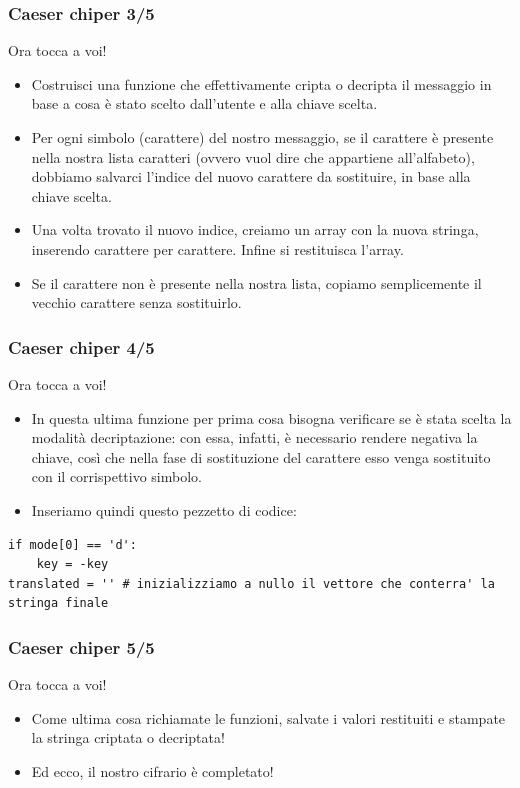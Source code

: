 \documentclass{beamer}
\begin{document}
\begin{frame}[fragile]
\frametitle{Caeser chiper 3/5}
\begin{block}{Ora tocca a voi!}
	\begin{itemize}
		\item Costruisci una funzione che effettivamente cripta o decripta il messaggio in base a cosa è stato scelto dall'utente e alla chiave scelta. 
		\item Per ogni simbolo (carattere) del nostro messaggio, se il carattere è presente nella nostra lista caratteri (ovvero vuol dire che appartiene all'alfabeto), dobbiamo salvarci l'indice del nuovo carattere da sostituire, in base alla chiave scelta.
		\item Una volta trovato il nuovo indice, creiamo un array con la nuova stringa, inserendo carattere per carattere. Infine si restituisca l'array.
		\item Se il carattere non è presente nella nostra lista, copiamo semplicemente il vecchio carattere senza sostituirlo.
	\end{itemize}
\end{block}
\end{frame}

\begin{frame}[fragile]
\frametitle{Caeser chiper 4/5}
\begin{block}{Ora tocca a voi!}
	\begin{itemize}
		\item In questa ultima funzione per prima cosa bisogna verificare se è stata scelta la modalità decriptazione: con essa, infatti, è necessario rendere negativa la chiave, così che nella fase di sostituzione del carattere esso venga sostituito con il corrispettivo simbolo.
		\item Inseriamo quindi questo pezzetto di codice:
	\end{itemize}
\end{block}
\begin{lstlisting}
if mode[0] == 'd':
    key = -key
translated = '' # inizializziamo a nullo il vettore che conterra' la stringa finale
\end{lstlisting}
\end{frame}

\begin{frame}[fragile]
\frametitle{Caeser chiper 5/5}
\begin{block}{Ora tocca a voi!}
	\begin{itemize}
		\item Come ultima cosa richiamate le funzioni, salvate i valori restituiti e stampate la stringa criptata o decriptata!
		\item Ed ecco, il nostro cifrario è completato! 
	\end{itemize}
\end{block}

\end{frame}
\end{document}
